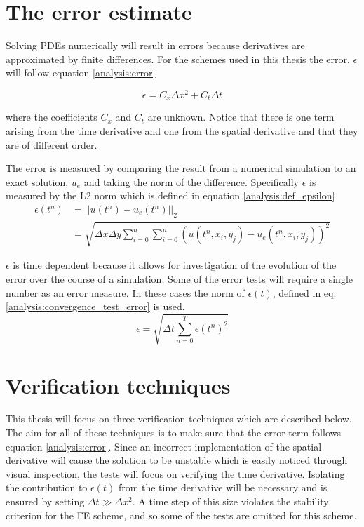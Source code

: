 \section{The error estimate}

Solving PDEs numerically will result in errors because derivatives are approximated by finite differences. 
For the schemes used in this thesis the error, $\epsilon$ will follow equation \eqref{analysis:error}

\begin{equation}\label{analysis:error}
 \epsilon = C_x\Delta x^2 + C_t\Delta t
\end{equation}

where the coefficients $C_x$ and $C_t$ are unknown. 
Notice that there is one term arising from the time derivative and one from the spatial derivative and that they are of different order. 

The error is measured by comparing the result from a numerical simulation to an exact solution, $u_e$ and taking the norm of the difference. 
Specifically $\epsilon$ is measured by the L2 norm which is defined in equation \eqref{analysis:def_epsilon}
\begin{align}
 \epsilon(t^n) &= ||u(t^n)-u_e(t^n)||_2 \nonumber \\
 &= \sqrt{\Delta x\Delta y\sum\limits_{i=0}^n\sum\limits_{i=0}^n \left(u(t^n,x_i,y_j)-u_e(t^n,x_i,y_j)\right)^2}\label{analysis:def_epsilon}
 \end{align}
 
$\epsilon$ is time dependent because it allows for investigation of the evolution of the error over the course of a simulation.
Some of the error tests will require a single number as an error measure. 
In these cases the norm of $\epsilon(t)$, defined in eq. \eqref{analysis:convergence_test_error} is used.
\begin{equation}\label{analysis:convergence_test_error}
 \epsilon = \sqrt{\Delta t\sum\limits_{n=0}^T\epsilon(t^n)^2}
\end{equation}

\section{Verification techniques}

This thesis will focus on three verification techniques which are described below. 
The aim for all of these techniques is to make sure that the error term follows equation \eqref{analysis:error}. 
Since an incorrect implementation of the spatial derivative will cause the solution to be unstable which is easily noticed through visual inspection, the tests will focus on verifying the time derivative. 
Isolating the contribution to $\epsilon(t)$ from the time derivative will be necessary and is ensured by setting $\Delta t \gg\Delta x^2$. 
A time step of this size violates the stability criterion for the FE scheme, and so some of the tests are omitted for this scheme. \\

